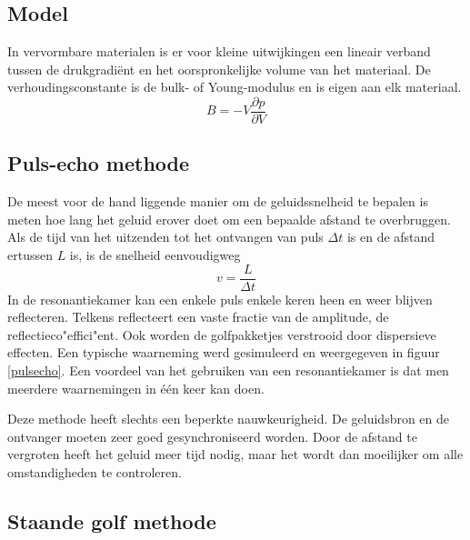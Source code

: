 \subsection{Model}

In vervormbare materialen is er voor kleine uitwijkingen een lineair verband 
tussen de drukgradi\"ent en het oorspronkelijke volume van het materiaal. De 
verhoudingsconstante is de bulk- of Young-modulus en is eigen aan elk 
materiaal.
\begin{equation}
\label{bulkmod}
B = - V \frac{\partial p}{\partial V}
\end{equation}

\subsection{Puls-echo methode}
De meest voor de hand liggende manier om de geluidssnelheid te bepalen is meten 
hoe lang het geluid erover doet om een bepaalde afstand te overbruggen. Als de 
tijd van het uitzenden tot het ontvangen van puls $\Delta t$ is en de afstand 
ertussen $L$ is, is de snelheid eenvoudigweg
$$
v = \frac{L}{\Delta t}
$$
In de resonantiekamer kan een enkele puls enkele keren heen en weer blijven 
reflecteren. Telkens reflecteert een vaste fractie van de amplitude, de 
reflectieco"effici"ent. Ook worden de golfpakketjes verstrooid door dispersieve 
effecten. Een typische waarneming werd gesimuleerd en weergegeven in figuur 
\ref{pulsecho}.  Een voordeel van het gebruiken van een resonantiekamer is dat
men meerdere waarnemingen in \'e\'en keer kan doen.


Deze methode heeft slechts een beperkte nauwkeurigheid.  De geluidsbron en de 
ontvanger moeten zeer goed gesynchroniseerd worden. Door de afstand te 
vergroten heeft het geluid meer tijd nodig, maar het wordt dan moeilijker om 
alle omstandigheden te controleren. 

\subsection{Staande golf methode}

